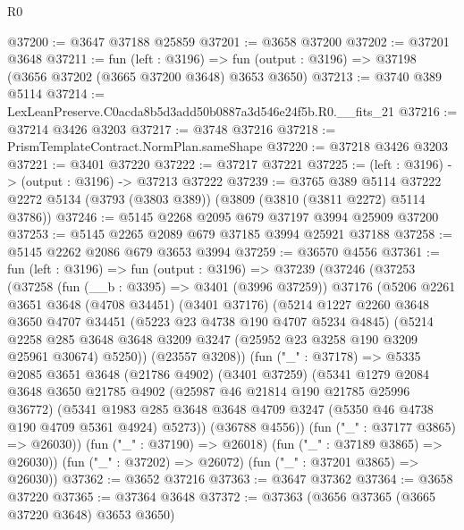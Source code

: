 \begin{lexlean}{R0}
\begin{coremodule}
@37200 := @3647 @37188 @25859
@37201 := @3658 @37200
@37202 := @37201 @3648
@37211 := fun (left : @3196) =>
  fun (output : @3196) => @37198 (@3656 @37202 (@3665 @37200 @3648) @3653 @3650)
@37213 := @3740 @389 @5114
@37214 := LexLeanPreserve.C0acda8b5d3add50b0887a3d546e24f5b.R0.__fits_21
@37216 := @37214 @3426 @3203
@37217 := @3748 @37216
@37218 := PrismTemplateContract.NormPlan.sameShape
@37220 := @37218 @3426 @3203
@37221 := @3401 @37220
@37222 := @37217 @37221
@37225 := (left : @3196) -> (output : @3196) -> @37213 @37222
@37239 := @3765
    @389
    @5114
    @37222
    @2272
    @5134
    (@3793 (@3803 @389))
    (@3809 (@3810 (@3811 @2272) @5114 @3786))
@37246 := @5145 @2268 @2095 @679 @37197 @3994 @25909 @37200
@37253 := @5145 @2265 @2089 @679 @37185 @3994 @25921 @37188
@37258 := @5145 @2262 @2086 @679 @3653 @3994
@37259 := @36570 @4556
@37361 := fun (left : @3196) =>
  fun (output : @3196) =>
  @37239
    (@37246
      (@37253
        (@37258
          (fun (__b : @3395) => @3401 (@3996 @37259))
          @37176
          (@5206
            @2261
            @3651
            @3648
            (@4708 @34451)
            (@3401 @37176)
            (@5214
              @1227
              @2260
              @3648
              @3650
              @4707
              @34451
              (@5223 @23 @4738 @190 @4707 @5234 @4845)
              (@5214
                @2258
                @285
                @3648
                @3648
                @3209
                @3247
                (@25952 @23 @3258 @190 @3209 @25961 @30674)
                @5250))
            (@23557 @3208))
          (fun ("_" : @37178) =>
          @5335
            @2085
            @3651
            @3648
            (@21786 @4902)
            (@3401 @37259)
            (@5341
              @1279
              @2084
              @3648
              @3650
              @21785
              @4902
              (@25987 @46 @21814 @190 @21785 @25996 @36772)
              (@5341
                @1983
                @285
                @3648
                @3648
                @4709
                @3247
                (@5350 @46 @4738 @190 @4709 @5361 @4924)
                @5273))
            (@36788 @4556))
          (fun ("_" : @37177 @3865) => @26030))
        (fun ("_" : @37190) => @26018)
        (fun ("_" : @37189 @3865) => @26030))
      (fun ("_" : @37202) => @26072)
      (fun ("_" : @37201 @3865) => @26030))
@37362 := @3652 @37216
@37363 := @3647 @37362
@37364 := @3658 @37220
@37365 := @37364 @3648
@37372 := @37363 (@3656 @37365 (@3665 @37220 @3648) @3653 @3650)

\end{coremodule}
\end{lexlean}
